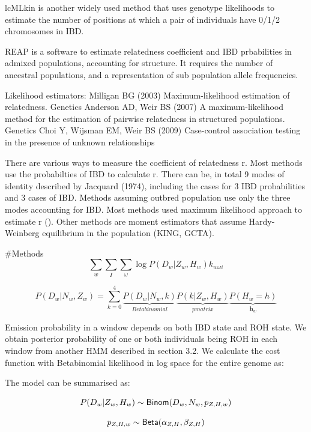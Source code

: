 \documentclass[12pt, letterpaper]{article}
\begin{document}
lcMLkin is another widely used method that uses genotype likelihoods to estimate the number of positions at which a pair of individuals have 0/1/2 chromosomes in IBD.  

REAP is a software to estimate relatedness coefficient and IBD prbabilities in admixed populations, accounting for structure. It requires the number of ancestral populations, and a representation of sub population allele frequencies. 

Likelihood estimators:
Milligan BG (2003) Maximum-likelihood estimation of relatedness. Genetics
Anderson AD, Weir BS (2007) A maximum-likelihood method for the estimation of pairwise relatedness in structured populations. Genetics
Choi Y, Wijsman EM, Weir BS (2009) Case-control association testing in the presence of unknown relationships

There are various ways to measure the coefficient of relatedness r. Most methods use the probabilties of IBD to calculate r. There can be, in total 9 modes of identity described by Jacquard (1974), including the cases for 3 IBD probabilities and 3 cases of IBD. Methods assuming outbred population use only the three modes accounting for IBD. Most methods used maximum likelihood approach to estimate r (). Other methods are moment estimators that assume Hardy-Weinberg equilibrium in the population (KING, GCTA).

#Methods
$$\sum_{w} \sum_{I}\sum_\omega \log P(D_{w}|Z_w, H_w)k_{w\omega i}$$



$$P(D_w | N_w, Z_w) = \sum_{k=0}^4 
\underbrace{P(D_w | N_w, k)}_{Betabinomial}
\underbrace{P(k | Z_w, H_w)}_{p matrix}
\underbrace{P(H_w =h)}_{\mathbf{h}_w}
$$

Emission probability in a window depends on both IBD state and ROH state. We obtain posterior probability of one or both individuals being ROH in each window from another HMM described in section 3.2. We calculate the cost function with Betabinomial likelihood in log space for the entire genome as:

The model can be summarised as:

\begin{equation}\label{eq:6}
P(D_w|Z_w,H_w) \sim {\sf Binom}(D_w, N_w, p_{Z,H,w})
\end{equation}

\begin{equation}\label{eq:7}
p_{Z,H,w} \sim {\sf Beta}(\alpha_{Z,H}, \beta_{Z,H})
\end{equation}
\end{document}
